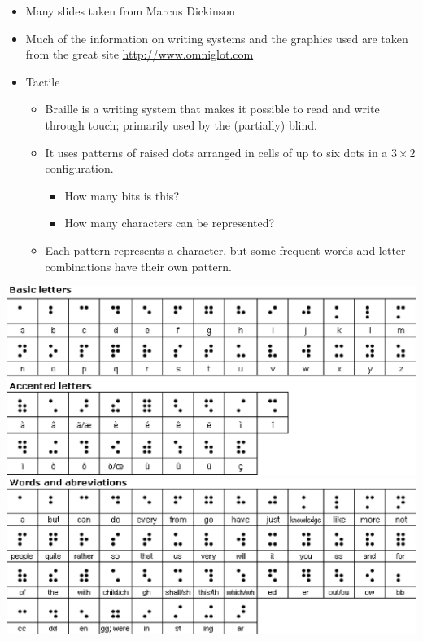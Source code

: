 \documentclass[a4paper,landscape,headrule,footrule,xetex]{foils}
\begin{document}

\begin{itemize}
\item Many slides taken from Marcus Dickinson
\item Much of the information on writing systems and the graphics used are taken from the great site \url{http://www.omniglot.com}
\end{itemize}



\begin{itemize}
\item Tactile
  \begin{itemize}
  \item Braille is a writing system that makes it possible to read and write through touch; primarily used by the (partially) blind.
  \item It uses patterns of raised dots arranged in cells of up to six dots in a $3 \times 2$ configuration.
    \begin{itemize}
    \item How many bits is this? %
    \item How many characters can be represented? %
    \end{itemize}
  \item Each pattern represents a character, but some frequent words and letter combinations have their own pattern.
  \end{itemize}
\end{itemize}


\includegraphics{../pics/braille_basic.eps}
\newpage
\includegraphics{../pics/braille_abbrr.eps}
\end{document}
